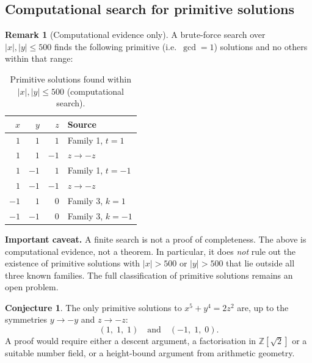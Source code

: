 \documentclass[12pt,a4paper]{article}
\theoremstyle{definition}
\newtheorem{remark}[theorem]{Remark}
\newtheorem{conjecture}[theorem]{Conjecture}
\newcommand{\Z}{\mathbb{Z}}
\begin{document}
\subsection{Computational search for primitive solutions}

\begin{remark}[Computational evidence only]\label{rem:search}
  A brute-force search over $|x|, |y| \leq 500$ finds the following
  primitive (i.e.\ $\gcd = 1$) solutions and no others within that range:

  \begin{table}[h]
  \centering
  \caption{Primitive solutions found within $|x|,|y|\leq 500$ (computational search).}
  \label{tab:primitive}
  \renewcommand{\arraystretch}{1.2}
  \begin{tabular}{rrrl}
  \toprule
  $x$ & $y$ & $z$ & Source \\
  \midrule
  $1$  & $1$  & $1$  & Family 1, $t = 1$ \\
  $1$  & $1$  & $-1$ & $z \to -z$ \\
  $1$  & $-1$ & $1$  & Family 1, $t = -1$ \\
  $1$  & $-1$ & $-1$ & $z \to -z$ \\
  $-1$ & $1$  & $0$  & Family 3, $k = 1$ \\
  $-1$ & $-1$ & $0$  & Family 3, $k = -1$ \\
  \bottomrule
  \end{tabular}
  \end{table}

  \textbf{Important caveat.}  A finite search is not a proof of completeness.
  The above is computational evidence, not a theorem.  In particular, it does
  \emph{not} rule out the existence of primitive solutions with $|x| > 500$
  or $|y| > 500$ that lie outside all three known families.  The full
  classification of primitive solutions remains an open problem.
\end{remark}

\begin{conjecture}\label{conj:prim}
  The only primitive solutions to $x^5 + y^4 = 2z^2$ are, up to the
  symmetries $y \to -y$ and $z \to -z$:
  \[
    (1,\;1,\;1) \quad \text{and} \quad (-1,\;1,\;0).
  \]
  A proof would require either a descent argument, a factorisation in
  $\Z[\sqrt{2}]$ or a suitable number field, or a height-bound argument
  from arithmetic geometry.
\end{conjecture}

\end{document}
